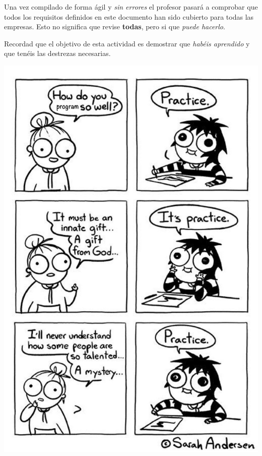 \documentclass[a4paper,10pt]{article}
\begin{document}
Una vez compilado de forma ágil y \textit{sin errores} el profesor pasará a comprobar que todos los requisitos definidos en este documento han sido cubierto para todas las empresas. Esto no significa que revise \textbf{todas}, pero si que \textit{puede hacerlo}.

Recordad que el objetivo de esta actividad es demostrar que \textit{habéis aprendido} y que tenéis las destrezas necesarias.

\includegraphics{imgs/practice}
\end{document}
